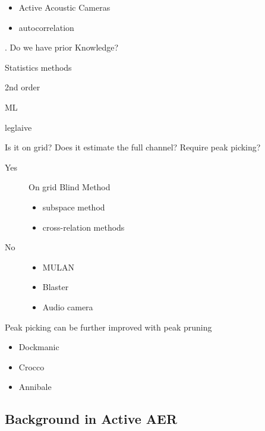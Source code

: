 \begin{description}
\begin{itemize}
\begin{itemize}
            \item Active Acoustic Cameras
            \item autocorrelation 
        \end{itemize}
    \end{itemize}
    \item[No]. Do we have prior Knowledge?
    \begin{description}
        \item[Yes] Statistics methods
            \item 2nd order
            \item ML
            \item leglaive
        \item[No] Is it on grid? Does it estimate the full channel? Require peak picking?
            \begin{description}
                \item[Yes] On grid Blind Method
                    \begin{itemize}
                    \item subspace method
                    \item cross-relation methods
                    \end{itemize}
                \item[No]
                \begin{itemize}
                    \item MULAN
                    \item Blaster
                    \item Audio camera
                \end{itemize}
            \end{description}
    \end{description}
\end{description}



Peak picking can be further improved with peak pruning
\begin{itemize}
    \item Dockmanic
    \item Crocco
    \item Annibale
\end{itemize}


\subsection{Background in Active AER}

